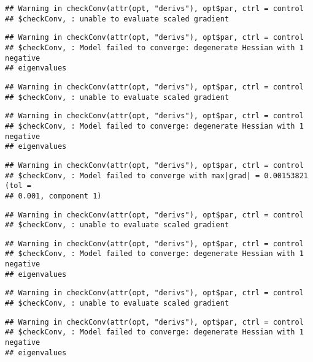 \documentclass[]{article}
\begin{document}
\begin{verbatim}
## Warning in checkConv(attr(opt, "derivs"), opt$par, ctrl = control
## $checkConv, : unable to evaluate scaled gradient
\end{verbatim}

\begin{verbatim}
## Warning in checkConv(attr(opt, "derivs"), opt$par, ctrl = control
## $checkConv, : Model failed to converge: degenerate Hessian with 1 negative
## eigenvalues
\end{verbatim}

\begin{verbatim}
## Warning in checkConv(attr(opt, "derivs"), opt$par, ctrl = control
## $checkConv, : unable to evaluate scaled gradient
\end{verbatim}

\begin{verbatim}
## Warning in checkConv(attr(opt, "derivs"), opt$par, ctrl = control
## $checkConv, : Model failed to converge: degenerate Hessian with 1 negative
## eigenvalues
\end{verbatim}

\begin{verbatim}
## Warning in checkConv(attr(opt, "derivs"), opt$par, ctrl = control
## $checkConv, : Model failed to converge with max|grad| = 0.00153821 (tol =
## 0.001, component 1)
\end{verbatim}

\begin{verbatim}
## Warning in checkConv(attr(opt, "derivs"), opt$par, ctrl = control
## $checkConv, : unable to evaluate scaled gradient
\end{verbatim}

\begin{verbatim}
## Warning in checkConv(attr(opt, "derivs"), opt$par, ctrl = control
## $checkConv, : Model failed to converge: degenerate Hessian with 1 negative
## eigenvalues
\end{verbatim}

\begin{verbatim}
## Warning in checkConv(attr(opt, "derivs"), opt$par, ctrl = control
## $checkConv, : unable to evaluate scaled gradient
\end{verbatim}

\begin{verbatim}
## Warning in checkConv(attr(opt, "derivs"), opt$par, ctrl = control
## $checkConv, : Model failed to converge: degenerate Hessian with 1 negative
## eigenvalues
\end{verbatim}
\end{document}
